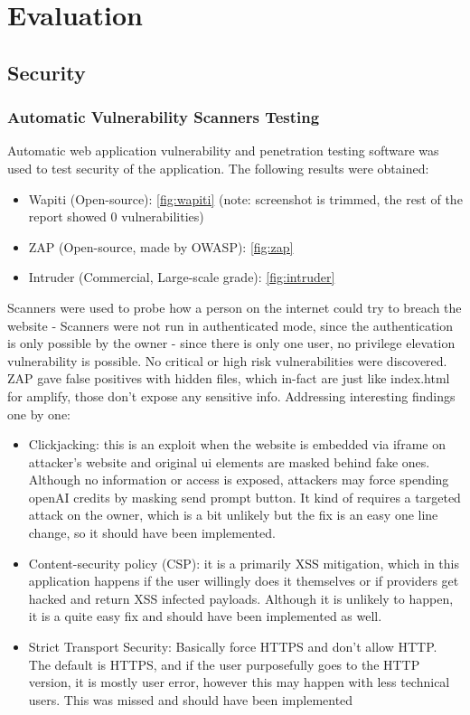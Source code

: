 \chapter{Evaluation}
\label{cha:evaluation}
\section{Security}
\subsection{Automatic Vulnerability Scanners Testing}
Automatic web application vulnerability and penetration testing software was used to test security of the application. The following results were obtained: 
\begin{itemize}
    \item Wapiti (Open-source): \ref{fig:wapiti} (note: screenshot is trimmed, the rest of the report showed 0 vulnerabilities)
    \item ZAP (Open-source, made by OWASP): \ref{fig:zap}
    \item Intruder (Commercial, Large-scale grade): \ref{fig:intruder}
\end{itemize}
Scanners were used to probe how a person on the internet could try to breach the website - Scanners were not run in authenticated mode, since the authentication is only possible by the owner - since there is only one user, no privilege elevation vulnerability is possible. No critical or high risk vulnerabilities were discovered. ZAP gave false positives with hidden files, which in-fact are just like index.html for amplify, those don't expose any sensitive info.  Addressing interesting findings one by one: 
\begin{itemize}
    \item Clickjacking: this is an exploit when the website is embedded via iframe on attacker's website and original ui elements are masked behind fake ones. Although no information or access is exposed, attackers may force spending openAI credits by masking send prompt button. It kind of requires a targeted attack on the owner, which is a bit unlikely but the fix is an easy one line change, so it should have been implemented.
    \item Content-security policy (CSP): it is a primarily XSS mitigation, which in this application happens if the user willingly does it themselves or if providers get hacked and return XSS infected payloads. Although it is unlikely to happen, it is a quite easy fix and should have been implemented as well. 
    \item Strict Transport Security: Basically force HTTPS and don't allow HTTP. The default is HTTPS, and if the user purposefully goes to the HTTP version, it is mostly user error, however this may happen with less technical users. This was missed and should have been implemented
\end{itemize}

